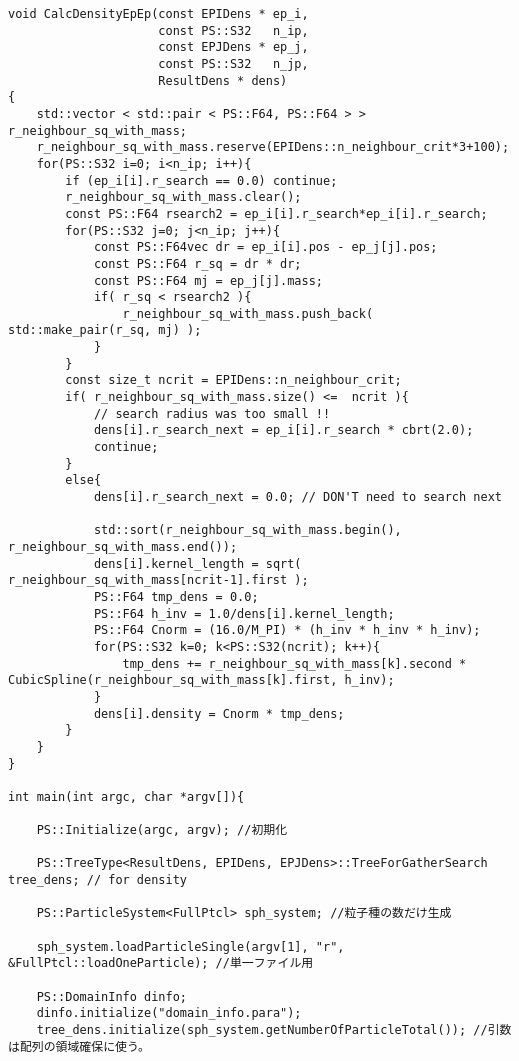 \begin{lstlisting}[caption=stdSPHシミュレーションのサンプルコード]
void CalcDensityEpEp(const EPIDens * ep_i,
                     const PS::S32   n_ip,
                     const EPJDens * ep_j,
                     const PS::S32   n_jp,
                     ResultDens * dens)
{
    std::vector < std::pair < PS::F64, PS::F64 > > r_neighbour_sq_with_mass;
    r_neighbour_sq_with_mass.reserve(EPIDens::n_neighbour_crit*3+100);
    for(PS::S32 i=0; i<n_ip; i++){
        if (ep_i[i].r_search == 0.0) continue; 
        r_neighbour_sq_with_mass.clear();
        const PS::F64 rsearch2 = ep_i[i].r_search*ep_i[i].r_search;
        for(PS::S32 j=0; j<n_ip; j++){
            const PS::F64vec dr = ep_i[i].pos - ep_j[j].pos;
            const PS::F64 r_sq = dr * dr;
            const PS::F64 mj = ep_j[j].mass;
            if( r_sq < rsearch2 ){
                r_neighbour_sq_with_mass.push_back( std::make_pair(r_sq, mj) );
            }
        }
        const size_t ncrit = EPIDens::n_neighbour_crit;
        if( r_neighbour_sq_with_mass.size() <=  ncrit ){
            // search radius was too small !!
            dens[i].r_search_next = ep_i[i].r_search * cbrt(2.0);
            continue;
        }
        else{
            dens[i].r_search_next = 0.0; // DON'T need to search next

            std::sort(r_neighbour_sq_with_mass.begin(), r_neighbour_sq_with_mass.end());
            dens[i].kernel_length = sqrt( r_neighbour_sq_with_mass[ncrit-1].first );
            PS::F64 tmp_dens = 0.0;
            PS::F64 h_inv = 1.0/dens[i].kernel_length;
            PS::F64 Cnorm = (16.0/M_PI) * (h_inv * h_inv * h_inv);
            for(PS::S32 k=0; k<PS::S32(ncrit); k++){
                tmp_dens += r_neighbour_sq_with_mass[k].second * CubicSpline(r_neighbour_sq_with_mass[k].first, h_inv);
            }
            dens[i].density = Cnorm * tmp_dens;
        }
    }
}

int main(int argc, char *argv[]){

    PS::Initialize(argc, argv); //初期化

    PS::TreeType<ResultDens, EPIDens, EPJDens>::TreeForGatherSearch tree_dens; // for density

    PS::ParticleSystem<FullPtcl> sph_system; //粒子種の数だけ生成

    sph_system.loadParticleSingle(argv[1], "r", &FullPtcl::loadOneParticle); //単一ファイル用

    PS::DomainInfo dinfo;
    dinfo.initialize("domain_info.para");
    tree_dens.initialize(sph_system.getNumberOfParticleTotal()); //引数は配列の領域確保に使う。


\end{lstlisting}
